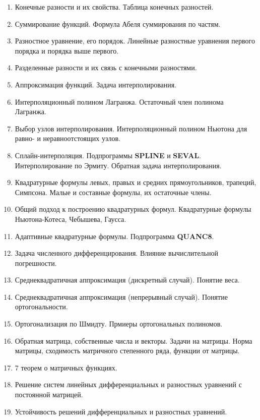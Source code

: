 \documentclass[../../calc-math-exam-2023.tex]{subfiles}
\begin{document}
    \begin{enumerate}
        \item Конечные разности и их свойства. Таблица конечных разностей.
        \item Суммирование функций. Формула Абеля суммирования по частям.
        \item Разностное уравнение, его порядок. Линейные разностные уравнения первого порядка и порядка выше первого.
        \item Разделенные разности и их связь с конечными разностями.
        \item Аппроксимация функций. Задача интерполирования.
        \item Интерполяционный полином Лагранжа. Остаточный член полинома Лагранжа.
        \item Выбор узлов интерполирования. Интерполяционный полином Ньютона для равно- и неравноотстоящих узлов.
        \item Сплайн-интерполяция. Подпрограммы \textbf{SPLINE} и \textbf{SEVAL}. Интерполирование по Эрмиту. Обратная задача интерполирования.
        \item Квадратурные формулы левых, правых и средних прямоугольников, трапеций, Симпсона. Малые и составные формулы, их остаточные члены.
        \item Общий подход к построению квадратурных формул. Квадратурные формулы Ньютона-Котеса, Чебышева, Гаусса.
        \item Адаптивные квадратурные формулы. Подпрограмма \textbf{QUANC8}.
        \item Задача численного дифференцирования. Влияние вычислительной погрешности.
        \item Среднеквадратичная аппроксимация (дискретный случай). Понятие веса.
        \item Среднеквадратичная аппроксимация (непрерывный случай). Понятие ортогональности.
        \item Ортогонализация по Шмидту. Прмиеры ортогональных полиномов.
        \item Обратная матрица, собственные числа и векторы. Задачи на матрицы. Норма матрицы, сходимость матричного степенного ряда, функции от матрицы.
        \item 7 теорем о матричных функциях.
        \item Решение систем линейных дифференциальных и разностных уравнений с постоянной матрицей.
        \item Устойчивость решений дифференциальных и разностных уравнений.

\end{enumerate}
\end{document}
